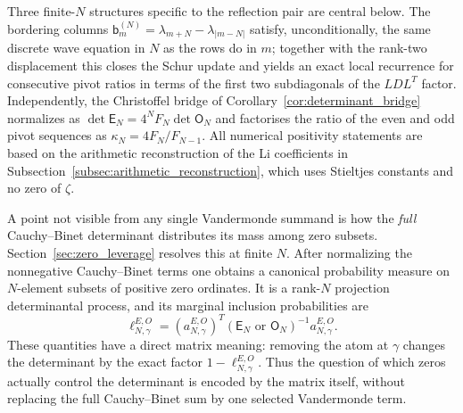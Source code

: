 \documentclass[11pt]{amsart}
\numberwithin{equation}{section}
\theoremstyle{plain}
\theoremstyle{definition}
\theoremstyle{remark}
\newcommand{\E}{\mathsf E}
\newcommand{\Omat}{\mathsf O}
\begin{document}
Three finite-$N$ structures specific to the reflection pair are central below.  The bordering columns $\mathsf b^{(N)}_m=\lambda_{m+N}-\lambda_{|m-N|}$ satisfy, unconditionally, the same discrete wave equation in $N$ as the rows do in $m$; together with the rank-two displacement this closes the Schur update and yields an exact local recurrence for consecutive pivot ratios in terms of the first two subdiagonals of the $LDL^T$ factor.  Independently, the Christoffel bridge of Corollary~\ref{cor:determinant_bridge} normalizes as $\det\E_N=4^NF_N\det\Omat_N$ and factorises the ratio of the even and odd pivot sequences as $\kappa_N=4F_N/F_{N-1}$.  All numerical positivity statements are based on the arithmetic reconstruction of the Li coefficients in Subsection~\ref{subsec:arithmetic_reconstruction}, which uses Stieltjes constants and no zero of $\zeta$.

A point not visible from any single Vandermonde summand is how the \emph{full} Cauchy--Binet determinant distributes its mass among zero subsets.  Section~\ref{sec:zero_leverage} resolves this at finite $N$.  After normalizing the nonnegative Cauchy--Binet terms one obtains a canonical probability measure on $N$-element subsets of positive zero ordinates.  It is a rank-$N$ projection determinantal process, and its marginal inclusion probabilities are
\begin{equation}
\ell_{N,\gamma}^{E,O}
=(a_{N,\gamma}^{E,O})^T(\E_N\text{ or }\Omat_N)^{-1}a_{N,\gamma}^{E,O}.
\label{eq:intro_zero_leverage}
\end{equation}
These quantities have a direct matrix meaning: removing the atom at $\gamma$ changes the determinant by the exact factor $1-\ell_{N,\gamma}^{E,O}$.  Thus the question of which zeros actually control the determinant is encoded by the matrix itself, without replacing the full Cauchy--Binet sum by one selected Vandermonde term.
\end{document}
